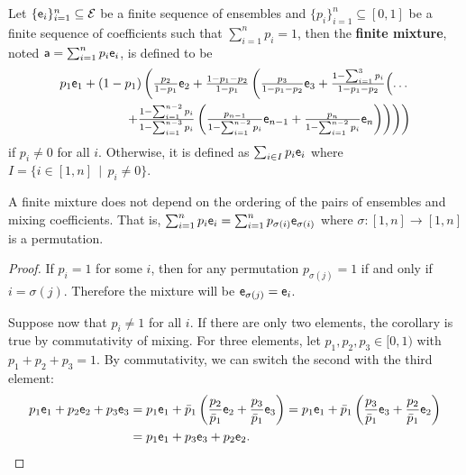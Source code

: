 \begin{mathSection}
\begin{defn}
	Let $\{\ens_i\}_{i=1}^{n} \subseteq \Ens$ be a finite sequence of ensembles and $\{p_i\}_{i=1}^{n} \subseteq [0,1]$ be a finite sequence of coefficients such that $\sum_{i=1}^{n} p_i = 1$, then the \textbf{finite mixture}, noted $\ens[a] = \sum_{i=1}^{n} p_i \ens_i$, is defined to be 
	\begin{equation}
		\begin{split}
	p_1 \ens_1 + (1-p_1)\left( \tfrac{p_2}{1-p_1} \ens_2 + \tfrac{1-p_1-p_2}{1-p_1} \left( \tfrac{p_3}{1-p_1-p_2} \ens_3 +  \tfrac{1-\sum_{i=1}^{3}p_i}{1-p_1-p_2}\Bigl(\ldots \right.\right. \\
\left.\left.\left.+\tfrac{1-\sum_{i=1}^{n-2}p_i}{1-\sum_{i=1}^{n-3}p_i}\left(\tfrac{p_{n-1}}{1- \sum_{i=1}^{n-2}p_i} \ens_{n-1} + \tfrac{p_n}{1- \sum_{i=1}^{n-2}p_i}\ens_n\right)\right) \right) \right)
		\end{split}
	\end{equation}
	if $p_i \neq 0$ for all $i$. Otherwise, it is defined as $\sum_{i \in I} p_i \ens_i$ where $I = \{ i \in [1,n] \, \mid \, p_i \neq 0 \}$.
\end{defn}

\begin{coro}
	A finite mixture does not depend on the ordering of the pairs of ensembles and mixing coefficients. That is, $\sum_{i=1}^{n} p_i \ens_i =\sum_{i=1}^{n} p_{\sigma(i)} \ens_{\sigma(i)}$ where $\sigma : [1,n] \to [1,n]$ is a permutation.
\end{coro}

\begin{proof}
	If $p_i = 1$ for some $i$, then for any permutation $p_{\sigma(j)} = 1$ if and only if $i = \sigma(j)$. Therefore the mixture will be $\ens_{\sigma(j)} = \ens_{i}$.
	
	Suppose now that $p_i \neq 1$ for all $i$. If there are only two elements, the corollary is true by commutativity of mixing. For three elements, let $p_1, p_2, p_3 \in [0,1)$ with $p_1+p_2+p_3=1$. By commutativity, we can switch the second with the third element:
	\begin{equation}
	\begin{aligned}
		p_1 \ens[e]_1 + p_2 \ens[e]_2 + p_3 \ens_3 &= p_1 \ens_1 + \bar{p}_1\left(\frac{p_2}{\bar{p}_1}\ens_2 + \frac{p_3}{\bar{p}_1}\ens_3\right) = p_1 \ens_1 + \bar{p}_1\left(\frac{p_3}{\bar{p}_1} \ens_3 +  \frac{p_2}{\bar{p}_1}\ens_2\right) \\
		&= p_1 \ens[e]_1 + p_3 \ens[e]_3 + p_2 \ens_2.
	\end{aligned}
	\end{equation}
	

\end{proof}
\end{mathSection}

